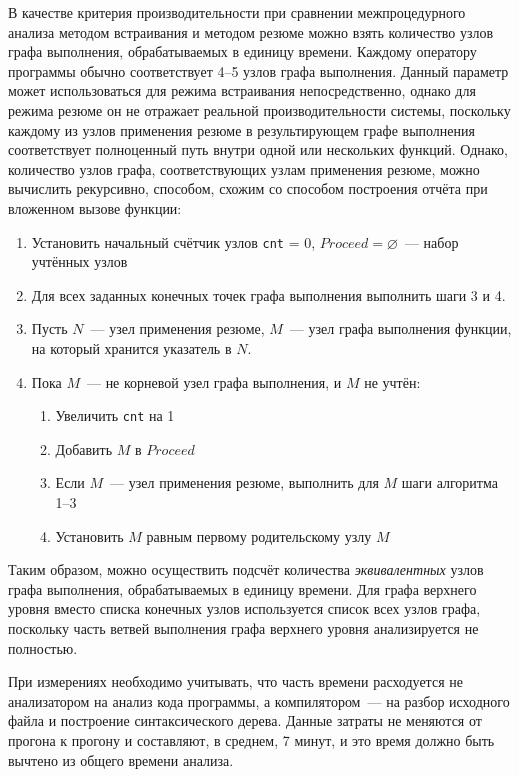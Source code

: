 В качестве критерия производительности при сравнении межпроцедурного анализа методом встраивания и методом резюме можно взять количество узлов графа выполнения, обрабатываемых в единицу времени. Каждому оператору программы обычно соответствует 4--5 узлов графа выполнения. Данный параметр может использоваться для режима встраивания непосредственно, однако для режима резюме он не отражает реальной производительности системы, поскольку каждому из узлов применения резюме в результирующем графе выполнения соответствует полноценный путь внутри одной или нескольких функций. Однако, количество узлов графа, соответствующих узлам применения резюме, можно вычислить рекурсивно, способом, схожим со способом построения отчёта при вложенном вызове функции: 

\begin{enumerate}
 \item Установить начальный счётчик узлов \texttt{cnt} = 0, $Proceed = \varnothing$~--- набор учтённых узлов 
 \item Для всех заданных конечных точек графа выполнения выполнить шаги 3 и 4.
 \item Пусть $N$~--- узел применения резюме, $M$~--- узел графа выполнения функции, на который хранится указатель в $N$.
 \item Пока $M$~--- не корневой узел графа выполнения, и $M$ не учтён:
  \begin{enumerate}
   \item Увеличить \texttt{cnt} на 1
   \item Добавить $M$ в $Proceed$
   \item Если $M$~--- узел применения резюме, выполнить для $M$ шаги алгоритма 1--3
   \item Установить $M$ равным первому родительскому узлу $M$
  \end{enumerate}
\end{enumerate}

Таким образом, можно осуществить подсчёт количества \textit{эквивалентных} узлов графа выполнения, обрабатываемых в единицу времени. Для графа верхнего уровня вместо списка конечных узлов используется список всех узлов графа, поскольку часть ветвей выполнения графа верхнего уровня анализируется не полностью.

При измерениях необходимо учитывать, что часть времени расходуется не анализатором на анализ кода программы, а компилятором~--- на разбор исходного файла и построение синтаксического дерева. Данные затраты не меняются от прогона к прогону и составляют, в среднем, 7 минут, и это время должно быть вычтено из общего времени анализа.

